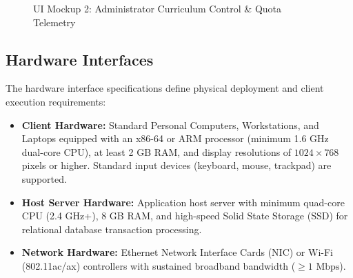 \documentclass[a4paper,12pt]{article}
\begin{document}
\begin{figure}[H]
{{
    }
}
\caption{UI Mockup 2: Administrator Curriculum Control \& Quota Telemetry}
\end{figure}


\subsection{Hardware Interfaces}
The hardware interface specifications define physical deployment and client execution requirements:
\begin{itemize}[leftmargin=1.2cm]
    \item \textbf{Client Hardware:} Standard Personal Computers, Workstations, and Laptops equipped with an x86-64 or ARM processor (minimum 1.6 GHz dual-core CPU), at least 2 GB RAM, and display resolutions of $1024\times768$ pixels or higher. Standard input devices (keyboard, mouse, trackpad) are supported.
    \item \textbf{Host Server Hardware:} Application host server with minimum quad-core CPU (2.4 GHz+), 8 GB RAM, and high-speed Solid State Storage (SSD) for relational database transaction processing.
    \item \textbf{Network Hardware:} Ethernet Network Interface Cards (NIC) or Wi-Fi (802.11ac/ax) controllers with sustained broadband bandwidth ($\ge 1\text{ Mbps}$).
\end{itemize}
\end{document}
